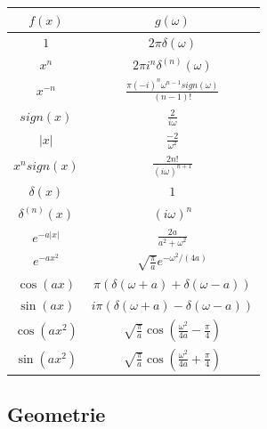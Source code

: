 \documentclass[12pt,a4paper]{article}
\newcommand{\abs}[1]{\left| #1 \right|}
\renewcommand{\=}[1]{\stackrel{#1}{=}}
\theoremstyle{definition}
\theoremstyle{remark}
\begin{document}
\noindent\begin{tabular}{cc}
$f(x)$ & $g(\omega)$\\
\hline
$1$ & $2 \pi \delta(\omega)$\\
$x^n$ & $2\pi i^n \delta^{(n)}(\omega)$\\
$x^{-n}$ & $\frac{\pi(-i)^n \omega^{n-1} sign(\omega)}{(n-1)!}$\\
$sign(x)$ & $\frac{2}{i\omega}$\\
$\abs{x}$ & $\frac{-2}{\omega^2}$\\
$x^n sign(x)$ & $\frac{2n!}{(i\omega)^{n+1}}$\\
$\delta(x)$ & $1$\\
$\delta^{(n)}(x)$ & $(i\omega)^n$\\
$e^{-a\abs{x}}$ & $\frac{2a}{a^2 + \omega^2}$\\
$e^{-ax^2}$ & $\sqrt{\frac{\pi}{a}} e^{-\omega^2 / (4a)}$\\
$\cos(ax)$ & $\pi (\delta(\omega+a) + \delta(\omega-a))$\\
$\sin(ax)$ & $i\pi (\delta(\omega+a) - \delta(\omega-a))$\\
$\cos(ax^2)$ & $\sqrt{\frac{\pi}{a}} \cos(\frac{\omega^2}{4a} - \frac{\pi}{4})$\\
$\sin(ax^2)$ & $\sqrt{\frac{\pi}{a}} \cos(\frac{\omega^2}{4a} + \frac{\pi}{4})$
\end{tabular}





\subsection{Geometrie}
\end{document}
